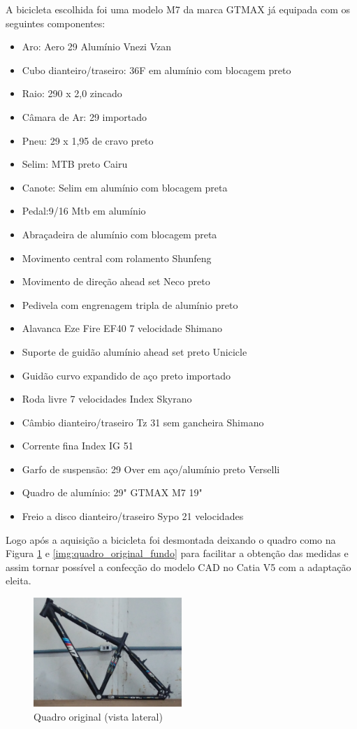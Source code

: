 	A bicicleta escolhida foi uma modelo M7 da marca GTMAX já equipada com os seguintes componentes:
	\begin{itemize}
		\item Aro: Aero 29 Alumínio Vnezi Vzan
		\item Cubo dianteiro/traseiro: 36F em alumínio com blocagem preto
		\item Raio: 290 x 2,0 zincado
		\item Câmara de Ar: 29 importado
		\item Pneu: 29 x 1,95 de cravo preto
		\item Selim: MTB preto Cairu
		\item Canote: Selim em alumínio com blocagem preta
		\item Pedal:9/16 Mtb em alumínio
		\item Abraçadeira de alumínio com blocagem preta
		\item Movimento central com rolamento Shunfeng
		\item Movimento de direção ahead set Neco preto
		\item Pedivela com engrenagem tripla de alumínio preto
		\item Alavanca Eze Fire EF40 7 velocidade Shimano
		\item Suporte de guidão alumínio ahead set preto Unicicle
		\item Guidão curvo expandido de aço preto importado
		\item Roda livre 7 velocidades Index Skyrano
		\item Câmbio dianteiro/traseiro Tz 31 sem gancheira Shimano
		\item Corrente fina Index IG 51
		\item Garfo de suspensão: 29 Over em aço/alumínio preto Verselli
		\item Quadro de alumínio: 29" GTMAX M7 19"
		\item Freio a disco dianteiro/traseiro Sypo 21 velocidades
	\end{itemize}

	Logo após a aquisição a bicicleta foi desmontada deixando o quadro como na Figura \ref{img:quadro_original_lateral} e \ref{img:quadro_original_fundo} para facilitar a obtenção das medidas e assim tornar possível a confecção do modelo CAD no Catia V5 com a adaptação eleita.
		
	\graphicspath{{figuras/}}
	\begin{figure}[!htb]
		\centering
		\includegraphics[width=0.5\textwidth]{quadro_original_lateral.jpg}
		\caption{Quadro original (vista lateral)}
		\label{img:quadro_original_lateral}
	\end{figure}
	
